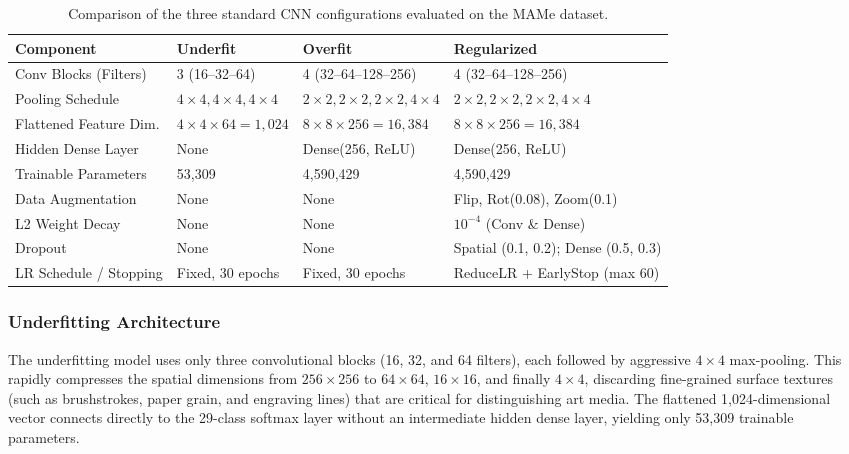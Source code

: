 \documentclass[11pt, a4paper]{article}
\begin{document}
\begin{table}[htbp]
\centering
\caption{Comparison of the three standard CNN configurations evaluated on the MAMe dataset.}
\label{tab:architectures}
\small
\begin{tabular}{@{}llll@{}}
\toprule
\textbf{Component} & \textbf{Underfit} & \textbf{Overfit} & \textbf{Regularized} \\
\midrule
Conv Blocks (Filters) & 3 (16--32--64) & 4 (32--64--128--256) & 4 (32--64--128--256) \\
Pooling Schedule & $4\times 4, 4\times 4, 4\times 4$ & $2\times 2, 2\times 2, 2\times 2, 4\times 4$ & $2\times 2, 2\times 2, 2\times 2, 4\times 4$ \\
Flattened Feature Dim. & $4\times 4\times 64 = 1{,}024$ & $8\times 8\times 256 = 16{,}384$ & $8\times 8\times 256 = 16{,}384$ \\
Hidden Dense Layer & None & Dense(256, ReLU) & Dense(256, ReLU) \\
Trainable Parameters & 53,309 & 4,590,429 & 4,590,429 \\
Data Augmentation & None & None & Flip, Rot(0.08), Zoom(0.1) \\
L2 Weight Decay & None & None & $10^{-4}$ (Conv \& Dense) \\
Dropout & None & None & Spatial (0.1, 0.2); Dense (0.5, 0.3) \\
LR Schedule / Stopping & Fixed, 30 epochs & Fixed, 30 epochs & ReduceLR + EarlyStop (max 60) \\
\bottomrule
\end{tabular}
\end{table}

\subsubsection{Underfitting Architecture}
The underfitting model uses only three convolutional blocks (16, 32, and 64 filters), each followed by aggressive $4 \times 4$ max-pooling. This rapidly compresses the spatial dimensions from $256 \times 256$ to $64 \times 64$, $16 \times 16$, and finally $4 \times 4$, discarding fine-grained surface textures (such as brushstrokes, paper grain, and engraving lines) that are critical for distinguishing art media. The flattened 1,024-dimensional vector connects directly to the 29-class softmax layer without an intermediate hidden dense layer, yielding only 53,309 trainable parameters.
\end{document}
